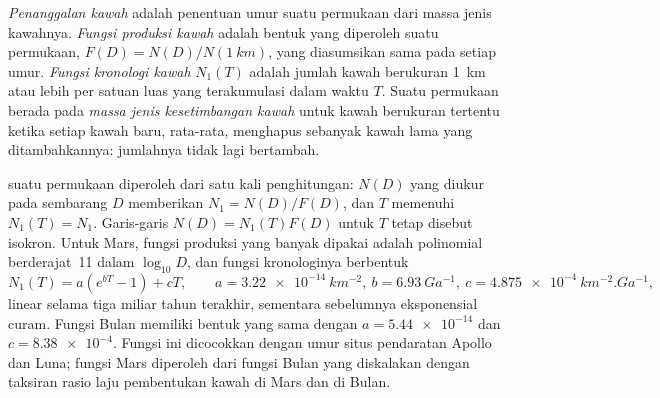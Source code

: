 \begin{definition}\label{def:b3:planetary-interiors-surfaces:crater-dating}
\emph{Penanggalan kawah} adalah penentuan umur
suatu permukaan dari massa jenis kawahnya. \emph{Fungsi produksi
kawah} adalah bentuk  yang diperoleh suatu permukaan, $F(D) =
N(D)/N(\qty{1}{km})$, yang diasumsikan sama pada setiap umur. \emph{Fungsi
kronologi kawah} $N_1(T)$ adalah jumlah kawah
berukuran \qty{1}{km} atau lebih per satuan luas yang terakumulasi dalam
waktu $T$. Suatu permukaan berada pada \emph{massa jenis kesetimbangan
kawah} untuk kawah berukuran tertentu
ketika setiap kawah baru, rata-rata, menghapus sebanyak kawah lama yang
ditambahkannya: jumlahnya tidak lagi bertambah.
\end{definition}

 suatu permukaan diperoleh dari satu kali penghitungan: $N(D)$ yang
diukur pada sembarang $D$ memberikan $N_1 = N(D)/F(D)$, dan $T$ memenuhi
$N_1(T) = N_1$. Garis-garis $N(D) = N_1(T)F(D)$ untuk $T$ tetap disebut
isokron. Untuk Mars, fungsi produksi yang banyak dipakai adalah polinomial
berderajat~11 dalam $\log_{10}D$, dan fungsi kronologinya berbentuk
\[
  N_1(T) = a\left(e^{bT} - 1\right) + cT , \qquad
  a = \qty{3.22e-14}{km^{-2}}, \ b = \qty{6.93}{Ga^{-1}}, \
  c = \qty{4.875e-4}{km^{-2}.Ga^{-1}} ,
\]
linear selama tiga miliar tahun terakhir, sementara sebelumnya eksponensial curam.
Fungsi Bulan memiliki bentuk yang sama dengan $a = \num{5.44e-14}$ dan $c =
\num{8.38e-4}$. Fungsi ini dicocokkan dengan umur situs pendaratan Apollo dan
Luna; fungsi Mars diperoleh dari fungsi Bulan yang diskalakan dengan taksiran
rasio laju pembentukan kawah di Mars dan di Bulan.

